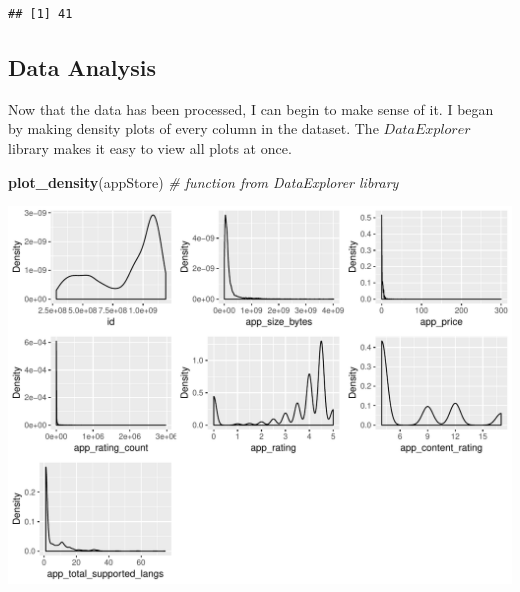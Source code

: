 \documentclass[]{article}
\newenvironment{Shaded}{\begin{snugshade}}{\end{snugshade}}
\newcommand{\CommentTok}[1]{\textcolor[rgb]{0.56,0.35,0.01}{\textit{#1}}}
\newcommand{\DecValTok}[1]{\textcolor[rgb]{0.00,0.00,0.81}{#1}}
\newcommand{\KeywordTok}[1]{\textcolor[rgb]{0.13,0.29,0.53}{\textbf{#1}}}
\newcommand{\NormalTok}[1]{#1}
\newcommand{\OperatorTok}[1]{\textcolor[rgb]{0.81,0.36,0.00}{\textbf{#1}}}
\newcommand{\OtherTok}[1]{\textcolor[rgb]{0.56,0.35,0.01}{#1}}
\newcommand{\StringTok}[1]{\textcolor[rgb]{0.31,0.60,0.02}{#1}}
\begin{document}
\begin{Shaded}
\end{Shaded}

\begin{verbatim}
## [1] 41
\end{verbatim}

\begin{Shaded}
\end{Shaded}

\hypertarget{data-analysis}{%
\subsection{Data Analysis}\label{data-analysis}}

Now that the data has been processed, I can begin to make sense of it. I
began by making density plots of every column in the dataset. The
\(\textit{DataExplorer}\) library makes it easy to view all plots at
once.

\begin{Shaded}
\begin{Highlighting}[]
\KeywordTok{plot_density}\NormalTok{(appStore)  }\CommentTok{# function from DataExplorer library}
\end{Highlighting}
\end{Shaded}

\begin{center}\includegraphics{Plots/analysis1-1} \end{center}
\newpage
\end{document}
